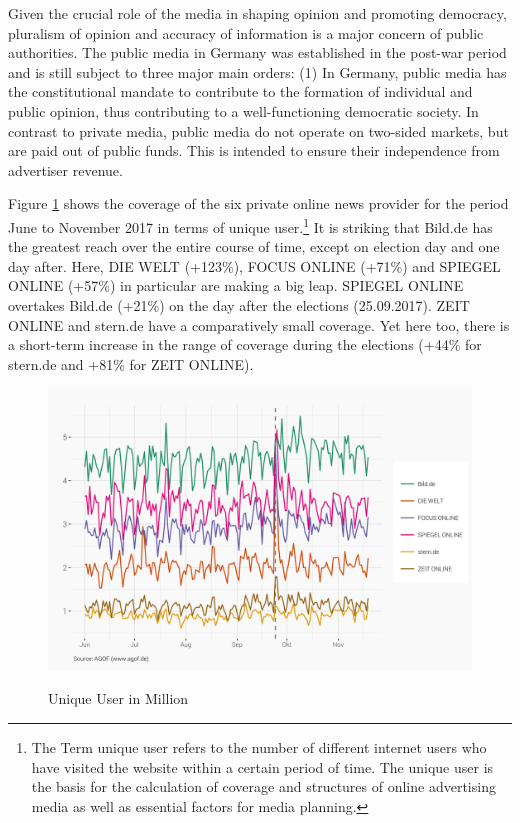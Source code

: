 \documentclass[12pt,a4paper,notitlepage]{article}
\begin{document}
Given the crucial role of the media in shaping opinion and promoting democracy, pluralism of opinion and accuracy of information is a major concern of public authorities. The public media in Germany was established in the post-war period and is still subject to three major main orders: (1)  In Germany, public media has the constitutional mandate to contribute to the formation of individual and public opinion, thus contributing to a well-functioning democratic society. In contrast to private media, public media do not operate on two-sided markets, but are paid out of public funds. This is intended to ensure their independence from advertiser revenue. 

Figure \ref{fig_uuser} shows the coverage of the six private online news provider for the period June to November 2017 in terms of unique user.\footnote{The Term unique user refers to the number of different internet users who have visited the website within a certain period of time. The unique user is the basis for the calculation of coverage and structures of online advertising media as well as essential factors for media planning.} It is striking that Bild.de has the greatest reach over the entire course of time, except on election day and one day after. Here, DIE WELT (+123\%), FOCUS ONLINE (+71\%) and SPIEGEL ONLINE (+57\%) in particular are making a big leap. SPIEGEL ONLINE overtakes Bild.de (+21\%) on the day after the elections (25.09.2017). ZEIT ONLINE and stern.de have a comparatively small coverage. Yet here too, there is a short-term increase in the range of coverage during the elections (+44\% for stern.de and +81\%  for ZEIT ONLINE).


\begin{figure}[H]
	\caption{Unique User in Million}
	\begin{center}
			\includegraphics[width=.9\textwidth]{../figs/uniqueUser.png}
			\label{fig_uuser}
	\end{center}
\end{figure}
\end{document}
